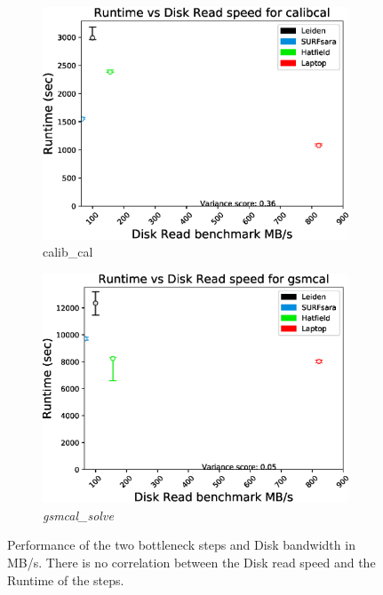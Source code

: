\begin{figure}
  \centering
   \begin{subfigure}{.45\textwidth}
    \includegraphics[width=\textwidth]{ch4/figures/fig11/calibcal_HDD.eps}
      \caption{calib\_cal }
	\label{fig:ch4_calib_cal_HDD}
 \end{subfigure}
  \begin{subfigure}{.45\textwidth}
    \includegraphics[width=\textwidth]{ch4/figures/fig11/GSMcal_HDD.eps}
      \caption{\textit{gsmcal\_solve}}
	\label{fig:ch4_gsmcal_HDD}
 \end{subfigure}
 \label{fig:ch4_HDD_2_steps}
    \caption[Performance of the two bottleneck steps and Disk bandwidth in MB/s.]{Performance of the two bottleneck steps and Disk bandwidth in MB/s. There is no correlation between the Disk read speed and the Runtime of the steps.} 
\end{figure}


